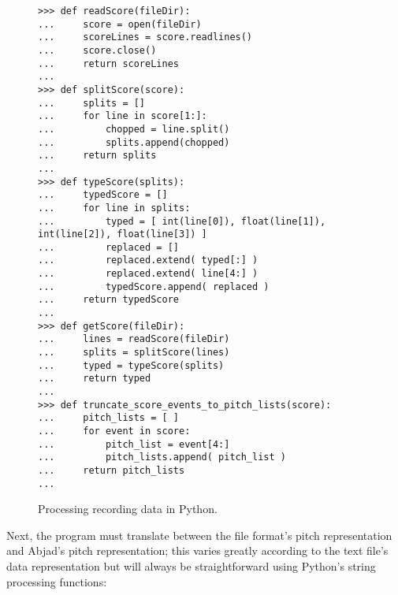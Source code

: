\begin{figure}[H]
\begin{lstlisting}[basicstyle=\scriptsize\ttfamily, breaklines=True, tabsize=4, showtabs=false, showspaces=false]
>>> def readScore(fileDir):
...     score = open(fileDir)
...     scoreLines = score.readlines()
...     score.close()
...     return scoreLines
... 
>>> def splitScore(score):
...     splits = []
...     for line in score[1:]: 
...         chopped = line.split()
...         splits.append(chopped)
...     return splits
... 
>>> def typeScore(splits):
...     typedScore = []
...     for line in splits:
...         typed = [ int(line[0]), float(line[1]), int(line[2]), float(line[3]) ]
...         replaced = []
...         replaced.extend( typed[:] )
...         replaced.extend( line[4:] )
...         typedScore.append( replaced )
...     return typedScore
... 
>>> def getScore(fileDir):
...     lines = readScore(fileDir)
...     splits = splitScore(lines)
...     typed = typeScore(splits)
...     return typed
... 
>>> def truncate_score_events_to_pitch_lists(score):
...     pitch_lists = [ ]
...     for event in score:
...         pitch_list = event[4:]
...         pitch_lists.append( pitch_list )
...     return pitch_lists
... \end{lstlisting}

\caption{Processing recording data in Python. } 
\end{figure}

Next, the program must translate between the file format's pitch representation and Abjad's pitch representation; this varies greatly according to the text file's data representation but will always be straightforward using Python's string processing functions:

